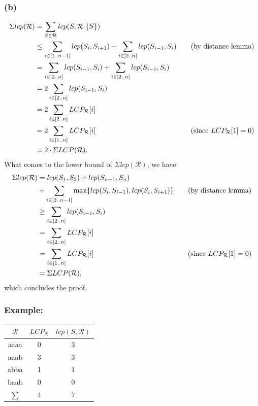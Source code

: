 \documentclass[10pt]{article}
\begin{document}
\subsubsection*{(b)}
\begin{align*}
\Sigma lcp(\mathcal{R}) &= \sum_{S \in \mathcal{R}} lcp(S, \mathcal{R} \ \{ S \}) \\
									  &\leq \sum_{i \in [1 .. n - 1]} lcp(S_i, S_{i + 1}) + \sum_{i \in [2 .. n]} lcp(S_{i - 1}, S_i) &\text{\quad (by distance lemma)} \\
									  &= \sum_{i \in [2 .. n]} lcp(S_{i - 1}, S_i) + \sum_{i \in [2 .. n]} lcp(S_{i - 1}, S_i) \\
									  &= 2 \sum_{i \in [2 .. n]} lcp(S_{i - 1}, S_i) \\
									  &= 2 \sum_{i \in [2 .. n]} LCP_{\mathcal{R}}[i] \\
									  &= 2 \sum_{i \in [1 .. n]} LCP_{\mathcal{R}}[i] & \text{\quad (since } LCP_{\mathcal{R}}[1] = 0) \\
									  &= 2 \cdot \Sigma LCP(\mathcal{R}).
\end{align*}
What comes to the lower bound of $\Sigma lcp(\mathcal{R})$, we have
\begin{align*}
\Sigma lcp(\mathcal{R}) &= lcp(S_1, S_2) + lcp(S_{n - 1}, S_n) \\
 									  &+ \sum_{i \in [2 .. n - 1]} \max \{ lcp(S_i, S_{i - 1}), lcp(S_i, S_{i + 1}) \} &\text{\quad (by distance lemma)} \\
    								  &\geq \sum_{i \in [2 .. n]} lcp(S_{i - 1}, S_i) \\
    								  &= \sum_{i \in [2 .. n]} LCP_{\mathcal{R}}[i] \\
    								  &= \sum_{i \in [1 .. n]} LCP_{\mathcal{R}}[i] & \text{\quad (since } LCP_{\mathcal{R}}[1] = 0) \\
    								  &= \Sigma LCP(\mathcal{R}),
\end{align*}
which concludes the proof.

\subsubsection*{Example:}
\begin{tabular}{|c|c|c|}
\hline
$\mathcal{R}$ & $LCP_{\mathcal{R}}$ & $lcp(S, \mathcal{R})$ \\
\hline
aaaa & 0 & 3 \\
aaab & 3 & 3 \\
abba & 1 & 1 \\
baab & 0 & 0 \\
\hline
$\sum$ & 4 & 7 \\
\hline
\end{tabular}
\end{document}
